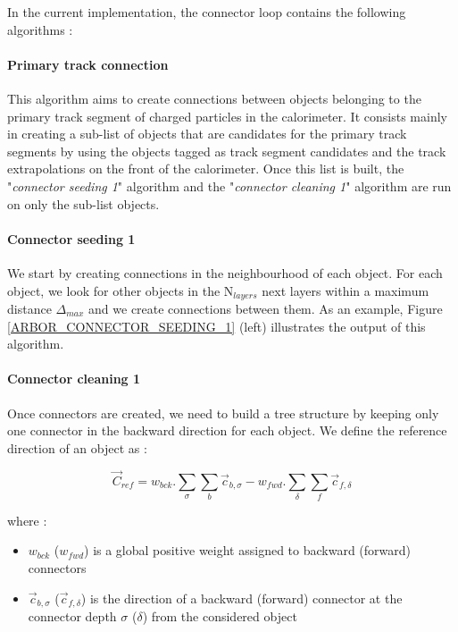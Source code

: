 \documentclass[cits]{JINST}
\begin{document}
In the current implementation, the connector loop contains the following algorithms :

\paragraph*{Primary track connection} This algorithm aims to create connections between objects belonging to the primary track segment of charged particles in the calorimeter. It consists mainly in creating a sub-list of objects that are candidates for the primary track segments by using the objects tagged as track segment candidates and the track extrapolations on the front of the calorimeter. Once this list is built, the "\textit{connector seeding 1}" algorithm and the "\textit{connector cleaning 1}" algorithm are run on only the sub-list objects.

\paragraph*{Connector seeding 1} We start by creating connections in the neighbourhood of each object. For each object, we look for other objects in the N$_{layers}$ next layers within a maximum distance $\Delta_{max}$ and we create connections between them. As an example, Figure \ref{ARBOR_CONNECTOR_SEEDING_1} (left) illustrates the output of this algorithm.

\paragraph*{Connector cleaning 1} Once connectors are created, we need to build a tree structure by keeping only one connector in the backward direction for each object. We define the reference direction of an object as :

\begin{equation}
  \vec{C}_{ref} = w_{bck} . \sum_\sigma \sum_b \vec{c}_{b,\sigma} - w_{fwd} . \sum_\delta \sum_f \vec{c}_{f,\delta}
\end{equation}

where :

\begin{itemize}
  \item $w_{bck}$ ($w_{fwd}$) is a global positive weight assigned to backward (forward) connectors
  \item $\vec{c}_{b,\sigma}$ ($\vec{c}_{f,\delta}$) is the direction of a backward (forward) connector at the connector depth $\sigma$ ($\delta$) from the considered object
\end{itemize}
\end{document}
